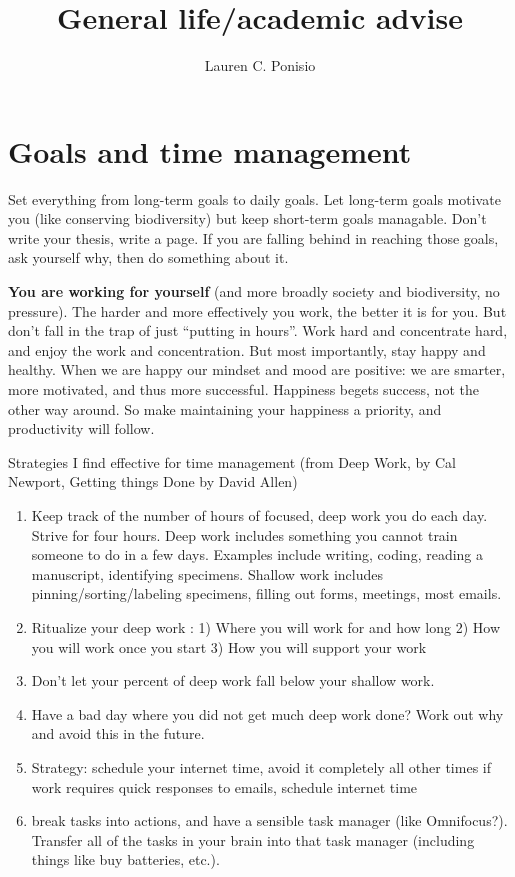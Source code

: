 \documentclass[12pt]{article}
\begin{document}
\title{General life/academic advise}
\author{Lauren C. Ponisio}

\maketitle

\section{Goals and time management}
\label{sec:goals}
Set everything from long-term goals to daily goals. Let long-term
goals motivate you (like conserving biodiversity) but keep short-term
goals managable. Don't write your thesis, write a page.  If you are
falling behind in reaching those goals, ask yourself why, then do
something about it.

\textbf{You are working for yourself} (and more broadly society and
biodiversity, no pressure). The harder and more effectively you work,
the better it is for you. But don't fall in the trap of just ``putting
in hours''.  Work hard and concentrate hard, and enjoy the work and
concentration. But most importantly, stay happy and healthy. When we
are happy our mindset and mood are positive: we are smarter, more
motivated, and thus more successful. Happiness begets success, not the
other way around. So make maintaining your happiness a priority, and
productivity will follow.

Strategies I find effective for time management (from Deep Work, by
Cal Newport, Getting things Done by David Allen)
\begin{enumerate}
\item Keep track of the number of hours of focused, deep work you do
  each day. Strive for four hours. Deep work includes something you
  cannot train someone to do in a few days. Examples include writing,
  coding, reading a manuscript, identifying specimens. Shallow work
  includes pinning/sorting/labeling specimens, filling out forms,
  meetings, most emails.
\item Ritualize your deep work : 1) Where you will work for and how
  long 2) How you will work once you start 3) How you will support
  your work
\item Don't let your percent of deep work fall below your shallow
  work. 
\item Have a bad day where you did not get much deep work done? Work
  out why and avoid this in the future.
\item Strategy: schedule your internet time, avoid it completely all
  other times if work requires quick responses to emails, schedule
  internet time
\item break tasks into actions, and have a sensible task manager (like
  Omnifocus?). Transfer all of the tasks in your brain into that task
  manager (including things like buy batteries, etc.).
\end{enumerate}
\end{document}

